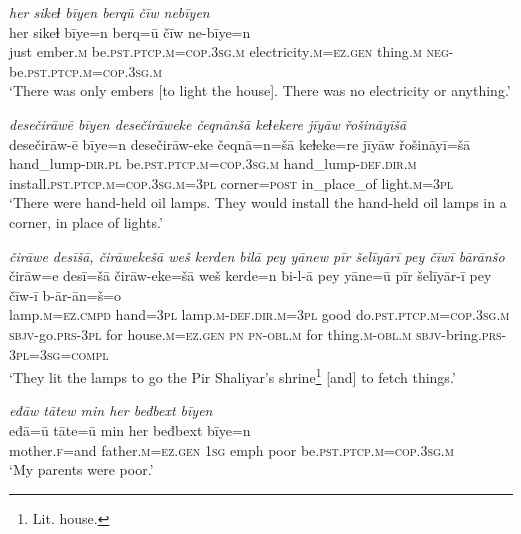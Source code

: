 \ea \label{ŽE.40}
\textit{her sikeɫ bīyen berqū čīw nebīyen} \\ 
\gll her sikeɫ bīye=n berq=ū čīw ne-bīye=n \\ 
 just ember\textsc{.m} be\textsc{.pst}\textsc{.ptcp}\textsc{.m}\textsc{=cop}\textsc{.3sg}\textsc{.m} electricity\textsc{.m}\textsc{\textsc{=ez.gen}} thing\textsc{.m} \textsc{neg-}be\textsc{.pst}\textsc{.ptcp}\textsc{.m}\textsc{=cop}\textsc{.3sg}\textsc{.m} \\ 
\glt `There was only embers [to light the house]. There was no electricity or anything.'
\z 
 
\ea \label{ŽE.41}
\textit{desečirāwē bīyen desečirāweke čeqnānšā keɫekere jīyāw řošināyīšā} \\ 
\gll desečirāw-ē bīye=n desečirāw-eke čeqnā=n=šā keɫeke=re jīyāw řošināyī=šā \\ 
 hand\_lump\textsc{-dir}\textsc{.pl} be\textsc{.pst}\textsc{.ptcp}\textsc{.m}\textsc{=cop}\textsc{.3sg}\textsc{.m} hand\_lump\textsc{-def}\textsc{.dir}\textsc{.m} install\textsc{.pst}\textsc{.ptcp}\textsc{.m}\textsc{=cop}\textsc{.3sg}\textsc{.m}\textsc{=3pl} corner\textsc{=\textsc{post}} in\_place\_of light\textsc{.m}\textsc{=3pl} \\ 
\glt `There were hand-held oil lamps. They would install the hand-held oil lamps in a corner, in place of lights.'
\z 
 
\ea \label{ŽE.42}
\textit{čirāwe desīšā, čirāwekešā weš kerden bilā pey yānew pīr šelīyārī pey čīwī bārānšo} \\ 
\gll čirāw=e desī=šā čirāw-eke=šā weš kerde=n bi-l-ā pey yāne=ū pīr šelīyār-ī pey čīw-ī b-ār-ān=š=o \\ 
 lamp\textsc{.m}\textsc{=ez}\textsc{.cmpd} hand\textsc{=3pl} lamp\textsc{.m}\textsc{-def}\textsc{.dir}\textsc{.m}\textsc{=3pl} good do\textsc{.pst}\textsc{.ptcp}\textsc{.m}\textsc{=cop}\textsc{.3sg}\textsc{.m} \textsc{sbjv-}go\textsc{.prs}\textsc{-3pl} for house\textsc{.m}\textsc{\textsc{=ez.gen}} \textsc{pn} \textsc{pn}\textsc{-obl}\textsc{.m} for thing\textsc{.m}\textsc{-obl}\textsc{.m} \textsc{sbjv-}bring\textsc{.prs}\textsc{-3pl}\textsc{=3sg}\textsc{=compl} \\ 
\glt `They lit the lamps to go the Pir Shaliyar’s shrine\footnote{Lit. house.} [and] to fetch things.'
\z 
 
\ea \label{ŽE.43}
\textit{eđāw tātew min her beđbext bīyen} \\ 
\gll eđā=ū tāte=ū min her beđbext bīye=n \\ 
 mother\textsc{.f}=and father\textsc{.m}\textsc{\textsc{=ez.gen}} \textsc{1sg} emph poor be\textsc{.pst}\textsc{.ptcp}\textsc{.m}\textsc{=cop}\textsc{.3sg}\textsc{.m} \\ 
\glt `My parents were poor.'
\z 
 
